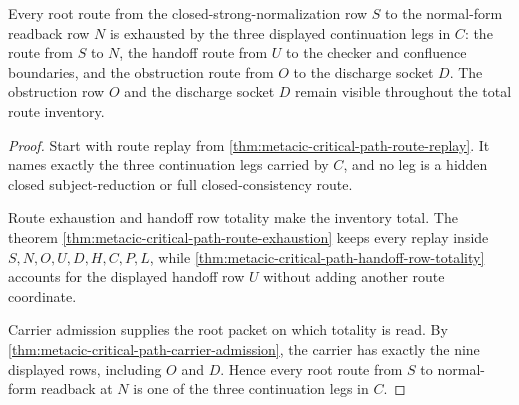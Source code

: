 \begin{theorem}
\label{thm:metacic-critical-path-root-route-totality}
Every root route from the closed-strong-normalization row $S$ to the normal-form readback row $N$ is exhausted by the three displayed continuation legs in $C$: the route from $S$ to $N$, the handoff route from $U$ to the checker and confluence boundaries, and the obstruction route from $O$ to the discharge socket $D$. The obstruction row $O$ and the discharge socket $D$ remain visible throughout the total route inventory.
\end{theorem}
\begin{proof}
Start with route replay from \autoref{thm:metacic-critical-path-route-replay}. It names exactly the three continuation legs carried by $C$, and no leg is a hidden closed subject-reduction or full closed-consistency route.

Route exhaustion and handoff row totality make the inventory total. The theorem \autoref{thm:metacic-critical-path-route-exhaustion} keeps every replay inside $S,N,O,U,D,H,C,P,L$, while \autoref{thm:metacic-critical-path-handoff-row-totality} accounts for the displayed handoff row $U$ without adding another route coordinate.

Carrier admission supplies the root packet on which totality is read. By \autoref{thm:metacic-critical-path-carrier-admission}, the carrier has exactly the nine displayed rows, including $O$ and $D$. Hence every root route from $S$ to normal-form readback at $N$ is one of the three continuation legs in $C$.
\end{proof}

